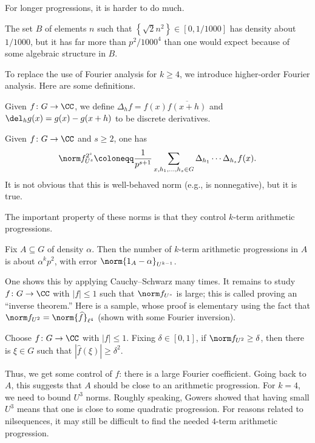 \documentclass{article}
\begin{document}
For longer progressions, it is harder to do much.
\begin{example}
	The set $B$ of elements $n$ such that $\left\{\sqrt2n^2\right\}\in[0,1/1000]$ has density about $1/1000$, but it has far more than $p^2/1000^4$ than one would expect because of some algebraic structure in $B$.
\end{example}
To replace the use of Fourier analysis for $k\ge4$, we introduce higher-order Fourier analysis. Here are some definitions.
\begin{definition}
	Given $f\colon G\to\CC$, we define $\Delta_hf=f(x)\overline{f(x+h)}$ and $\del_hg(x)=g(x)-g(x+h)$ to be discrete derivatives.
\end{definition}
\begin{definition}
	Given $f\colon G\to\CC$ and $s\ge2$, one has
	\[\norm f_{U^s}^{2^s}\coloneqq\frac1{p^{s+1}}\sum_{x,h_1,\ldots,h_s\in G}\Delta_{h_1}\cdots\Delta_{h_s}f(x).\]
	It is not obvious that this is well-behaved norm (e.g., is nonnegative), but it is true.
\end{definition}
The important property of these norms is that they control $k$-term arithmetic progressions.
\begin{lemma}
	Fix $A\subseteq G$ of density $\alpha$. Then the number of $k$-term arithmetic progressions in $A$ is about $\alpha^kp^2$, with error $\norm{1_A-\alpha}_{U^{k-1}}$.
\end{lemma}
One shows this by applying Cauchy--Schwarz many times. It remains to study $f\colon G\to\CC$ with $\left|f\right|\le1$ such that $\norm f_{U^s}$ is large; this is called proving an ``inverse theorem.'' Here is a sample, whose proof is elementary using the fact that $\norm f_{U^2}=\norm{\widehat f}_{\ell^4}$ (shown with some Fourier inversion).
\begin{theorem}
	Choose $f\colon G\to\CC$ with $\left|f\right|\le1$. Fixing $\delta\in[0,1]$, if $\norm f_{U^2}\ge\delta$, then there is $\xi\in G$ such that $\left|\widehat f(\xi)\right|\ge\delta^2$.
\end{theorem}
Thus, we get some control of $f$: there is a large Fourier coefficient. Going back to $A$, this suggests that $A$ should be close to an arithmetic progression. For $k=4$, we need to bound $U^3$ norms. Roughly speaking, Gowers showed that having small $U^3$ means that one is close to some quadratic progression. For reasons related to nilsequences, it may still be difficult to find the needed $4$-term arithmetic progression.
\end{document}

